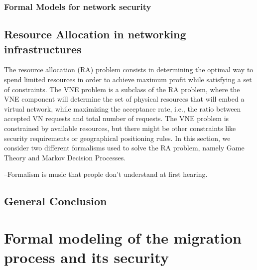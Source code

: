 \documentclass[a4paper, 11pt]{report}
\newcommand{\ie}{i.e.,\xspace}
\theoremstyle{definition}
\begin{document}


\subsection{Formal Models for network security}



\section{Resource Allocation in networking infrastructures}
The resource allocation (RA) problem consists in determining the optimal way to spend limited resources in order to achieve maximum profit while satisfying a set of constraints.
The VNE problem is a subclass of the RA problem, where the VNE component will determine the set of physical resources that will embed a virtual network, while maximizing the acceptance rate, \ie the ratio between accepted VN requests and total number of requests.
The VNE problem is constrained by available resources, but there might be other constraints like security requirements or geographical positioning rules.
In this section, we consider two different formalisms used to solve the RA problem, namely Game Theory and Markov Decision Processes. 

% 



\begin{savequote}

--Formalism is music that people don’t understand at first hearing.
\end{savequote}
\section{General Conclusion}


\newpage
\chapter{Formal modeling of the migration process and its security}
\label{sec:formal_model}


% 
\end{document}
